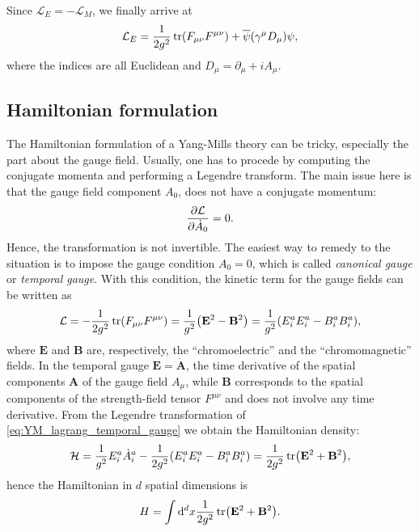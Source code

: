 Since $\mathcal{L}_E = - \mathcal{L}_M$, we finally arrive at
\begin{equation}
    \mathcal{L}_E
    = \frac{1}{2 g^2} \tr (F_{\mu \nu} F^{\mu \nu}) + \overline{\psi} \qty( \gamma^{\mu} D_{\mu} ) \psi,
\end{equation}
where the indices are all Euclidean and $D_{\mu} = \partial_{\mu} + i A_{\mu}$.



\subsection{Hamiltonian formulation}
\label{sub:hamiltonian_formulation}

The Hamiltonian formulation of a Yang-Mills theory can be tricky, especially the part about the gauge field.
Usually, one has to procede by computing the conjugate momenta and performing a Legendre transform.
The main issue here is that the gauge field component $A_0$, does not have a conjugate momentum:
\begin{equation}
    \pdv{\mathcal{L}}{\dot{A}_0} = 0.
\end{equation}
Hence, the transformation is not invertible.
The easiest way to remedy to the situation is to impose the gauge condition $A_0 = 0$,
which is called \emph{canonical gauge} or \emph{temporal gauge}.
With this condition, the kinetic term for the gauge fields can be written as
\begin{equation}
    \mathcal{L}
    = - \frac{1}{2 g^2} \tr(F_{\mu \nu} F^{\mu \nu})
    = \frac{1}{g^2} \qty( \mathbf{E}^2 - \mathbf{B}^2 )
    = \frac{1}{g^2} \qty(E^a_i E^a_i - B^a_i B^a_i),
    \label{eq:YM_lagrang_temporal_gauge}
\end{equation}
where $\mathbf{E}$ and $\mathbf{B}$ are, respectively, the ``chromoelectric'' and the ``chromomagnetic'' fields.
In the temporal gauge $\mathbf{E} = \dot{\mathbf{A}}$, the time derivative of the spatial components $\mathbf{A}$ of the gauge field $A_{\mu}$, while $\mathbf{B}$ corresponds to the spatial components of the strength-field tensor $F^{\mu \nu}$ and does not involve any time derivative.
From the Legendre transformation of \eqref{eq:YM_lagrang_temporal_gauge} we obtain the Hamiltonian density:
\begin{equation}
    \mathcal{H}
    = \frac{1}{g^2} E^a_i \dot{A}^a_i - \frac{1}{2 g^2} \qty( E^a_i E^a_i - B^a_i B^a_i )
    = \frac{1}{2g^2} \tr ( \mathbf{E}^2 + \mathbf{B}^2 ),
\end{equation}
hence the Hamiltonian in $d$ spatial dimensions is
\begin{equation}
    H = \int \dd^{d} x \frac{1}{2 g^2} \tr(\mathbf{E}^2 + \mathbf{B}^2).
\end{equation}

